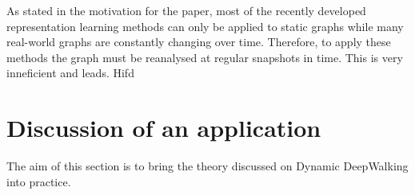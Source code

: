 \documentclass[a4paper]{article}
\begin{document}
As stated in the motivation for the paper, most of the recently developed
representation learning methods can only be applied to static graphs while many
real-world graphs are constantly changing over time. Therefore, to apply these
methods the graph must be reanalysed at regular snapshots in time. This is very
inneficient and leads. Hifd


\section{Discussion of an application}

The aim of this section is to bring the theory discussed on Dynamic DeepWalking
into practice.






\printindex
\end{document}
